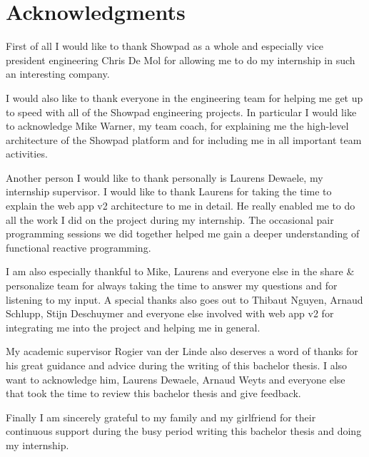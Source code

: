 \chapter*{Acknowledgments}%
\label{sec:woord-vooraf}
\thispagestyle{plain}

First of all I would like to thank Showpad as a whole and especially vice president engineering Chris De Mol for allowing me to do my internship in such an interesting company.

I would also like to thank everyone in the engineering team for helping me get up to speed with all of the Showpad engineering projects. In particular I would like to acknowledge Mike Warner, my team coach, for explaining me the high-level architecture of the Showpad platform and for including me in all important team activities.

Another person I would like to thank personally is Laurens Dewaele, my internship supervisor. I would like to thank Laurens for taking the time to explain the web app v2 architecture to me in detail. He really enabled me to do all the work I did on the project during my internship. The occasional pair programming sessions we did together helped me gain a deeper understanding of functional reactive programming.

I am also especially thankful to Mike, Laurens and everyone else in the share \& personalize team for always taking the time to answer my questions and for listening to my input. A special thanks also goes out to Thibaut Nguyen, Arnaud Schlupp, Stijn Deschuymer and everyone else involved with web app v2 for integrating me into the project and helping me in general.

My academic supervisor Rogier van der Linde also deserves a word of thanks for his great guidance and advice during the writing of this bachelor thesis. I also want to acknowledge him, Laurens Dewaele, Arnaud Weyts and everyone else that took the time to review this bachelor thesis and give feedback.

Finally I am sincerely grateful to my family and my girlfriend for their continuous support during the busy period writing this bachelor thesis and doing my internship.